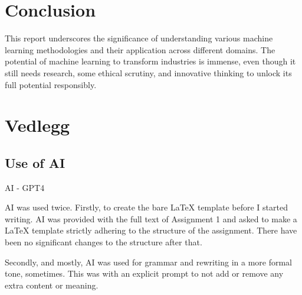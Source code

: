 \documentclass[11pt]{article}
\begin{document}
\section{Conclusion}

This report underscores the significance of understanding various machine learning methodologies and their application across different domains. The potential of machine learning to transform industries is immense, even though it still needs research, some ethical scrutiny, and innovative thinking to unlock its full potential responsibly.



\newpage
\section*{Vedlegg}
\subsection*{Use of AI}
AI - GPT4

AI was used twice. Firstly, to create the bare LaTeX template before I started writing. AI was provided with the full text of Assignment 1 and asked to make a LaTeX template strictly adhering to the structure of the assignment. There have been no significant changes to the structure after that.

Secondly, and mostly, AI was used for grammar and rewriting in a more formal tone, sometimes. This was with an explicit prompt to not add or remove any extra content or meaning.
\end{document}
